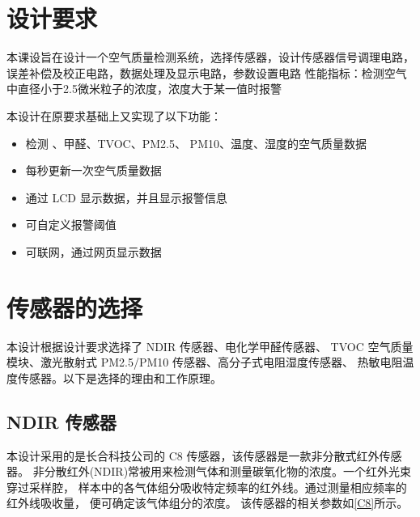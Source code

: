 \documentclass[12pt,hyperref,a4paper,UTF8]{ctexart}
\begin{document}
\cover

%
%

\thispagestyle{empty} %

\newpage
\tableofcontents

\newpage


\section{设计要求}
本课设旨在设计一个空气质量检测系统，选择传感器，设计传感器信号调理电路，
误差补偿及校正电路，数据处理及显示电路，参数设置电路
性能指标：检测空气中直径小于2.5微米粒子的浓度，浓度大于某一值时报警

本设计在原要求基础上又实现了以下功能：
\begin{itemize}
    \item 检测 、甲醛、TVOC、PM2.5、 PM10、温度、湿度的空气质量数据
    \item 每秒更新一次空气质量数据
    \item 通过 LCD 显示数据，并且显示报警信息
    \item 可自定义报警阈值
    \item 可联网，通过网页显示数据
\end{itemize}

\section{传感器的选择}
本设计根据设计要求选择了 NDIR  传感器、电化学甲醛传感器、
TVOC 空气质量模块、激光散射式 PM2.5/PM10 传感器、高分子式电阻湿度传感器、
热敏电阻温度传感器。以下是选择的理由和工作原理。

\subsection{NDIR  传感器}
本设计采用的是长合科技公司的 C8 传感器，该传感器是一款非分散式红外传感器。
非分散红外(NDIR)常被用来检测气体和测量碳氧化物的浓度。一个红外光束穿过采样腔，
样本中的各气体组分吸收特定频率的红外线。通过测量相应频率的红外线吸收量，
便可确定该气体组分的浓度。
该传感器的相关参数如\autoref{C8}所示。
\end{document}
